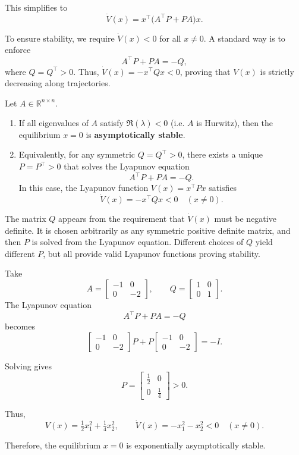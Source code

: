 This simplifies to
\[
\dot V(x) = x^\top \big(A^\top P + P A\big) x.
\]

To ensure stability, we require \(\dot V(x)<0\) for all \(x\neq 0\).  
A standard way is to enforce
\[
A^\top P + P A = -Q,
\]
where \(Q=Q^\top>0\).  
Thus, \(\dot V(x) = -x^\top Q x < 0\), proving that \(V(x)\) is strictly decreasing along trajectories.

\begin{theorem}
Let \(A\in\mathbb{R}^{n\times n}\).
\begin{enumerate}
  \item If all eigenvalues of \(A\) satisfy \(\Re(\lambda)<0\) (i.e. \(A\) is Hurwitz), then the equilibrium \(x=0\) is \textbf{asymptotically stable}.
  \item Equivalently, for any symmetric \(Q=Q^\top>0\), there exists a unique \(P=P^\top>0\) that solves the Lyapunov equation
  \[
  A^\top P + P A = -Q.
  \]
  In this case, the Lyapunov function \(V(x)=x^\top P x\) satisfies
  \[
  \dot V(x) = -x^\top Q x < 0 \quad (x\neq 0).
  \]
\end{enumerate}
\end{theorem}

\begin{remark}
The matrix \(Q\) appears from the requirement that \(\dot V(x)\) must be negative definite.  
It is chosen arbitrarily as any symmetric positive definite matrix, and then \(P\) is solved from the Lyapunov equation.  
Different choices of \(Q\) yield different \(P\), but all provide valid Lyapunov functions proving stability.
\end{remark}

\begin{example}
Take
\[
A=\begin{bmatrix}-1 & 0\\[4pt] 0 & -2\end{bmatrix}, \qquad 
Q=\begin{bmatrix}1 & 0\\[4pt] 0 & 1\end{bmatrix}.
\]
The Lyapunov equation
\[
A^\top P + P A = -Q
\]
becomes
\[
\begin{bmatrix}-1 & 0\\[4pt] 0 & -2\end{bmatrix}
P + P
\begin{bmatrix}-1 & 0\\[4pt] 0 & -2\end{bmatrix}
= -I.
\]

Solving gives
\[
P=\begin{bmatrix}\tfrac12 & 0\\[4pt] 0 & \tfrac14\end{bmatrix}>0.
\]

Thus,
\[
V(x)=\tfrac12 x_1^2+\tfrac14 x_2^2, \qquad 
\dot V(x) = -x_1^2 - x_2^2 < 0 \quad (x\neq 0).
\]

Therefore, the equilibrium \(x=0\) is exponentially asymptotically stable.
\end{example}

